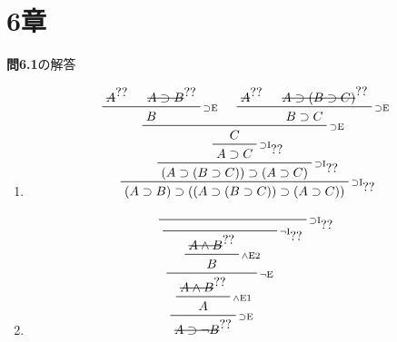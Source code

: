 \documentclass[11pt,dvipdfmx]{jreport}
\begin{document}
\section*{6章}

\vspace{3mm}
\par

\noindent \textbf{問6.1}の解答
\par
\renewcommand{\labelenumi}{\arabic{enumi}) }
\begin{enumerate}
 \item 
\begin{displaymath}
\prftree[r]{$\scriptstyle\supset\mathrm{I}_{\prfref<assum:AB>}$}
 {\prftree[r]{$\scriptstyle\supset\mathrm{I}_{\prfref<assum:ABC>}$}
  {\prftree[r]{$\scriptstyle\supset\mathrm{I}_{\prfref<assum:A>}$}
   {\prfinterspace=1.5em
    \prftree[r]{$\scriptstyle\supset\mathrm{E}$}
    {\prftree[r]{$\scriptstyle\supset\mathrm{E}$}
     {\prfboundedstyle=1\prfboundedassumption<assum:A>{A}}
     {\prfboundedstyle=1\prfboundedassumption<assum:AB>{A \supset B}}
     {B}
    }
    {\prftree[r]{$\scriptstyle\supset\mathrm{E}$}
     {\prfboundedstyle=1\prfboundedassumption<assum:A>{A}}
     {\prfboundedstyle=1\prfboundedassumption<assum:ABC>{A \supset (B \supset C)}}
     {B \supset C}
    }
    {C}
   }
   {A \supset C}
  }
  {(A \supset (B \supset C)) \supset (A \supset C)}
 }
{(A \supset B) \supset ((A \supset (B \supset C)) \supset (A \supset C))}
\end{displaymath}\vspace{.2ex}
 \item 
   \begin{displaymath}
     \setcounter{prfassumptioncounter}{0}
     \prftree[r]{$\scriptstyle\supset\mathrm{I}_{\prfref<assum:AB0>}$}
             {\prftree[r]{$\scriptstyle\neg\mathrm{I}_{\prfref<assum:ABbot0>}$}
               {\prfinterspace=1.5em
                 \prftree[r]{$\scriptstyle\neg\mathrm{E}$}
                         {\prftree[r]{$\scriptstyle\land\mathrm{E2}$}
                           {\prfboundedstyle=1\prfboundedassumption<assum:AB0>{A \land B}}
                           {B}
                         }
                         {\prftree[r]{$\scriptstyle\supset\mathrm{E}$}
                           {\prftree[r]{$\scriptstyle\land\mathrm{E1}$}
                             {\prfboundedstyle=1\prfboundedassumption<assum:AB0>{A \land B}}      
                             {A}
                           }
                           {\prfboundedstyle=1\prfboundedassumption<assum:ABbot0>{A \supset \neg B}}
}}}
\end{displaymath}
\end{enumerate}
\end{document}
